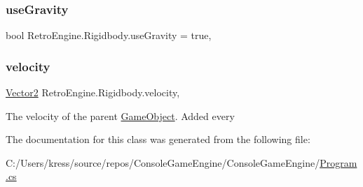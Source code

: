 \subsubsection{\texorpdfstring{useGravity}{useGravity}}
{\footnotesize\ttfamily bool Retro\+Engine.\+Rigidbody.\+use\+Gravity = true\hspace{0.3cm}{\ttfamily [get]}, {\ttfamily [set]}}

\mbox{\label{class_retro_engine_1_1_rigidbody_ae2a5f06e35972b8e557e9914186eda0e}} 
\subsubsection{\texorpdfstring{velocity}{velocity}}
{\footnotesize\ttfamily \mbox{\hyperlink{struct_retro_engine_1_1_vector2}{Vector2}} Retro\+Engine.\+Rigidbody.\+velocity\hspace{0.3cm}{\ttfamily [get]}, {\ttfamily [set]}}



The velocity of the parent \mbox{\hyperlink{class_retro_engine_1_1_game_object}{Game\+Object}}. Added every 



The documentation for this class was generated from the following file\+:\begin{DoxyCompactItemize}
\item 
C\+:/\+Users/kress/source/repos/\+Console\+Game\+Engine/\+Console\+Game\+Engine/\mbox{\hyperlink{_program_8cs}{Program.\+cs}}\end{DoxyCompactItemize}
